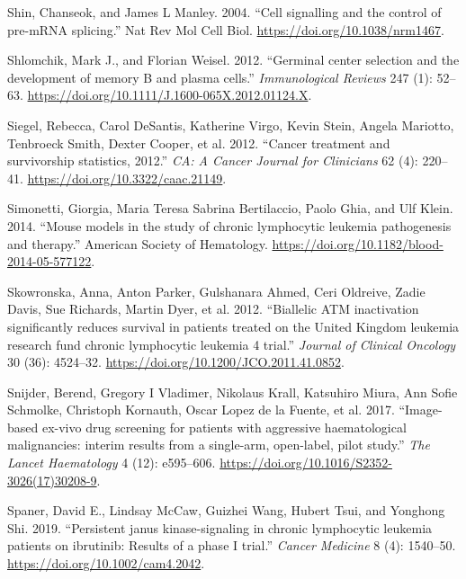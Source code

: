 \documentclass[11pt, a4paper, twosided]{book}
\newenvironment{CSLReferences}%
  {}%
  {\par}
\begin{document}
\begin{CSLReferences}{1}{0}
\leavevmode{}%
Shin, Chanseok, and James L Manley. 2004. {``{Cell signalling and the control of pre-mRNA splicing}.''} Nat Rev Mol Cell Biol. \url{https://doi.org/10.1038/nrm1467}.

\leavevmode{}%
Shlomchik, Mark J., and Florian Weisel. 2012. {``{Germinal center selection and the development of memory B and plasma cells}.''} \emph{Immunological Reviews} 247 (1): 52--63. \url{https://doi.org/10.1111/J.1600-065X.2012.01124.X}.

\leavevmode{}%
Siegel, Rebecca, Carol DeSantis, Katherine Virgo, Kevin Stein, Angela Mariotto, Tenbroeck Smith, Dexter Cooper, et al. 2012. {``{Cancer treatment and survivorship statistics, 2012}.''} \emph{CA: A Cancer Journal for Clinicians} 62 (4): 220--41. \url{https://doi.org/10.3322/caac.21149}.

\leavevmode{}%
Simonetti, Giorgia, Maria Teresa Sabrina Bertilaccio, Paolo Ghia, and Ulf Klein. 2014. {``{Mouse models in the study of chronic lymphocytic leukemia pathogenesis and therapy}.''} American Society of Hematology. \url{https://doi.org/10.1182/blood-2014-05-577122}.

\leavevmode{}%
Skowronska, Anna, Anton Parker, Gulshanara Ahmed, Ceri Oldreive, Zadie Davis, Sue Richards, Martin Dyer, et al. 2012. {``{Biallelic ATM inactivation significantly reduces survival in patients treated on the United Kingdom leukemia research fund chronic lymphocytic leukemia 4 trial}.''} \emph{Journal of Clinical Oncology} 30 (36): 4524--32. \url{https://doi.org/10.1200/JCO.2011.41.0852}.

\leavevmode{}%
Snijder, Berend, Gregory I Vladimer, Nikolaus Krall, Katsuhiro Miura, Ann Sofie Schmolke, Christoph Kornauth, Oscar Lopez de la Fuente, et al. 2017. {``{Image-based ex-vivo drug screening for patients with aggressive haematological malignancies: interim results from a single-arm, open-label, pilot study}.''} \emph{The Lancet Haematology} 4 (12): e595--606. \url{https://doi.org/10.1016/S2352-3026(17)30208-9}.

\leavevmode{}%
Spaner, David E., Lindsay McCaw, Guizhei Wang, Hubert Tsui, and Yonghong Shi. 2019. {``{Persistent janus kinase-signaling in chronic lymphocytic leukemia patients on ibrutinib: Results of a phase I trial}.''} \emph{Cancer Medicine} 8 (4): 1540--50. \url{https://doi.org/10.1002/cam4.2042}.


\end{CSLReferences}
\end{document}
